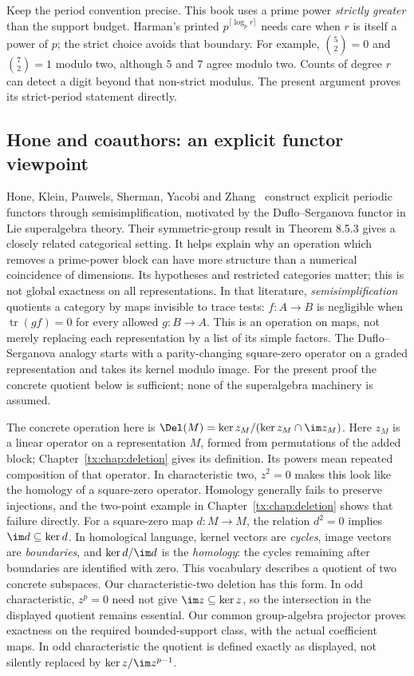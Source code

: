 Keep the period convention precise. This book uses a prime power
\emph{strictly greater} than the support budget. Harman's printed
$p^{\lceil\log_p r\rceil}$ needs care when $r$ is itself a power of
$p$; the strict choice avoids that boundary. For example,
$\binom52=0$ and $\binom72=1$ modulo two, although $5$ and $7$ agree
modulo two. Counts of degree $r$ can detect a digit beyond that
non-strict modulus. The present argument proves its strict-period
statement directly.

\subsection{Hone and coauthors: an explicit functor viewpoint}
Hone, Klein, Pauwels, Sherman, Yacobi and Zhang~\cite{HKPSYZ}
construct explicit periodic functors through semisimplification,
motivated by the Duflo--Serganova functor in Lie superalgebra theory.
Their symmetric-group result in Theorem 8.5.3 gives a closely related
categorical setting. It helps explain why an operation which removes
a prime-power block can have more structure than a numerical
coincidence of dimensions. Its hypotheses and restricted categories
matter; this is not global exactness on all representations.
In that literature, \emph{semisimplification} quotients a category by
maps invisible to trace tests: $f:A\to B$ is negligible when
$\operatorname{tr}(gf)=0$ for every allowed $g:B\to A$.
This is an operation on maps, not merely replacing each representation
by a list of its simple factors.
The Duflo--Serganova analogy starts with a parity-changing square-zero
operator on a graded representation and takes its kernel modulo image.
For the present proof the concrete quotient below is sufficient;
none of the superalgebra machinery is assumed.

The concrete operation here is
$\Del(M)=\ker z_M/(\ker z_M\cap\im z_M)$. Here $z_M$ is a linear
operator on a representation $M$, formed from permutations of the
added block; Chapter~\ref{tx:chap:deletion} gives its definition.
Its powers mean repeated composition of that operator. In characteristic two,
$z^2=0$ makes this look like the homology of a square-zero operator.
Homology generally fails to preserve injections, and the two-point
example in Chapter~\ref{tx:chap:deletion} shows that failure directly.
For a square-zero map $d:M\to M$, the relation $d^2=0$ implies
$\im d\subseteq\ker d$. In homological language, kernel vectors are
\emph{cycles}, image vectors are \emph{boundaries}, and
$\ker d/\im d$ is the \emph{homology}: the cycles remaining after
boundaries are identified with zero.
This vocabulary describes a quotient of two concrete subspaces.
Our characteristic-two deletion has this form. In odd characteristic,
$z^p=0$ need not give $\im z\subseteq\ker z$, so the intersection
in the displayed quotient remains essential.
Our common group-algebra projector proves exactness on the required
bounded-support class, with the actual coefficient maps. In odd
characteristic the quotient is defined exactly as displayed, not
silently replaced by $\ker z/\im z^{p-1}$.

